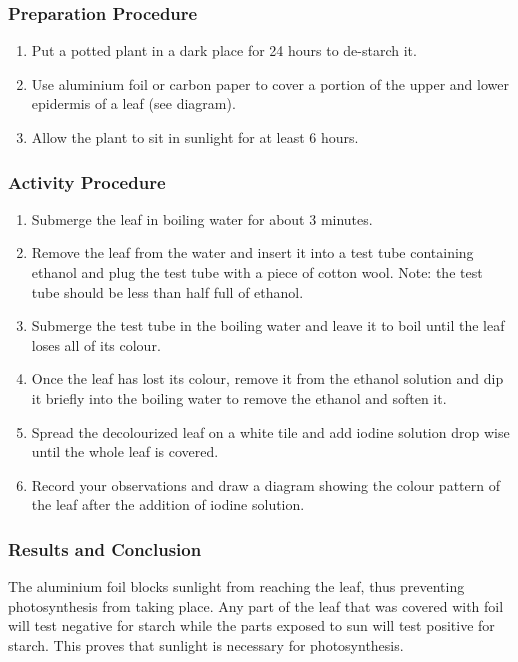 \subsubsection*{Preparation Procedure}
\begin{enumerate}
\item{Put a potted plant in a dark place for 24 hours to de-starch it.}
\item{Use aluminium foil or carbon paper to cover a portion of the upper and lower epidermis of a leaf (see diagram).}
\item{Allow the plant to sit in sunlight for at least 6 hours.}
\end{enumerate}

\subsubsection*{Activity Procedure}
\begin{enumerate}
\item{Submerge the leaf in boiling water for about 3 minutes.}
\item{Remove the leaf from the water and insert it into a test tube containing ethanol and plug the test tube with a piece of cotton wool. Note: the test tube should be less than half full of ethanol.}
\item{Submerge the test tube in the boiling water and leave it to boil until the leaf loses all of its colour.}
\item{Once the leaf has lost its colour, remove it from the ethanol solution and dip it briefly into the boiling water to remove the ethanol and soften it.}
\item{Spread the decolourized leaf on a white tile and add iodine solution drop wise until the whole leaf is covered.}
\item{ Record your observations and draw a diagram showing the colour pattern of the leaf after the addition of iodine solution.}
\end{enumerate}

\subsubsection*{Results and Conclusion}
The aluminium foil blocks sunlight from reaching the leaf, thus preventing photosynthesis from taking place. Any part of the leaf that was covered with foil will test negative for starch while the parts exposed to sun will test positive for starch. This proves that sunlight is necessary for photosynthesis.

